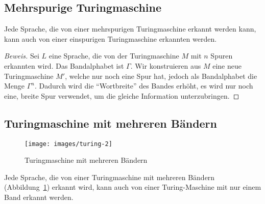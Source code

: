 \subsection{Mehrspurige Turingmaschine}
%
\begin{satz}\label{mehrspurigeturingmaschine}
Jede Sprache, die von einer mehrspurigen Turingmaschine
erkannt werden kann, kann auch von einer einspurigen Turingmaschine
erkannten werden.
\end{satz}

\begin{proof}[Beweis]
Sei $L$ eine Sprache, die von der Turingmaschine $M$ mit $n$ Spuren
erkannten wird. Das Bandalphabet ist $\Gamma$. Wir konstruieren aus
$M$ eine neue Turingmaschine $M'$, welche nur noch eine Spur hat,
jedoch als Bandalphabet die Menge $\Gamma^n$. Dadurch wird die ``Wortbreite''
des Bandes erhöht, es wird nur noch eine, breite Spur verwendet, um die
gleiche Information unterzubringen.
\end{proof}

\subsection{Turingmaschine mit mehreren Bändern}
%
\begin{figure}
\begin{center}
\texttt{[image: images/turing-2]}
\end{center}
\caption{Turingmaschine mit mehreren Bändern\label{multitapetm}}
\end{figure}
\begin{satz}
\label{mehrbandturingmaschine}
Jede Sprache, die von einer Turingmaschine mit mehreren Bändern
(Abbildung~\ref{multitapetm})
erkannt
wird, kann auch von einer Turing-Maschine mit nur einem Band erkannt
werden.
\end{satz}

